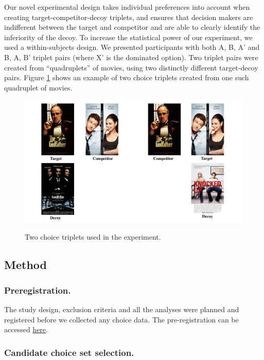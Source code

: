 \documentclass[12pt, a4paper]{article}
\begin{document}
Our novel experimental design takes individual preferences into account when creating target-competitor-decoy triplets, and ensures that decision makers are indifferent between the target and competitor and are able to clearly identify the inferiority of the decoy. To increase the statistical power of our experiment, we used a within-subjects design. We presented participants with both A, B, A' and B, A, B' triplet pairs (where X' is the dominated option). Two triplet pairs were created from ``quadruplets'' of movies, using two distinctly different target-decoy pairs. Figure \ref{fig:quadruplets} shows an example of two choice triplets created from one such quadruplet of movies.


\begin{figure}
\centering
		 \caption{Two choice triplets used in the experiment.}
\includegraphics[width=1\textwidth]{figure1.pdf}
\label{fig:quadruplets}
\end{figure}

\subsection*{Method}

\subsubsection*{Preregistration.}
The study design, exclusion criteria and all the analyses were planned and registered before we collected any choice data. The pre-registration can be accessed \href{https://osf.io/fme6c/?view_only=31da4193689f4247a76af93b2f98fcef}{here}.

\subsubsection*{Candidate choice set selection.}
\end{document}

